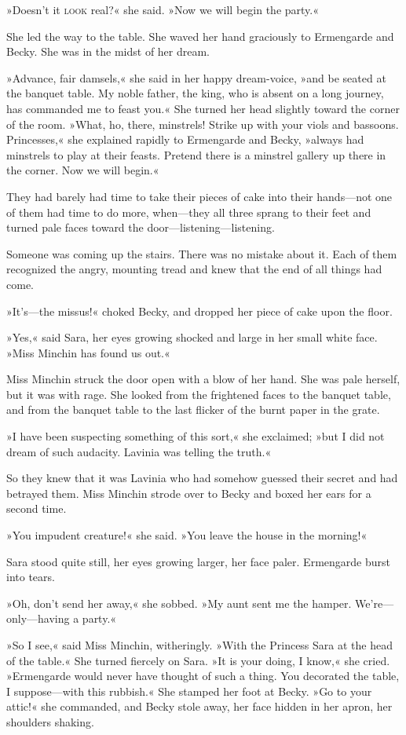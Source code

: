 »Doesn't it \textsc{look} real?« she said. »Now we will begin the party.«

She led the way to the table. She waved her hand graciously to Ermengarde and Becky. She was in the midst of her dream.

»Advance, fair damsels,« she said in her happy dream-voice, »and be seated at the banquet table. My noble father, the king, who is absent on a long journey, has commanded me to feast you.« She turned her head slightly toward the corner of the room. »What, ho, there, minstrels! Strike up with your viols and bassoons. Princesses,« she explained rapidly to Ermengarde and Becky, »always had minstrels to play at their feasts. Pretend there is a minstrel gallery up there in the corner. Now we will begin.«

They had barely had time to take their pieces of cake into their hands—not one of them had time to do more, when—they all three sprang to their feet and turned pale faces toward the door—listening—listening.

Someone was coming up the stairs. There was no mistake about it. Each of them recognized the angry, mounting tread and knew that the end of all things had come.

»It's—the missus!« choked Becky, and dropped her piece of cake upon the floor.

»Yes,« said Sara, her eyes growing shocked and large in her small white face. »Miss Minchin has found us out.«

Miss Minchin struck the door open with a blow of her hand. She was pale herself, but it was with rage. She looked from the frightened faces to the banquet table, and from the banquet table to the last flicker of the burnt paper in the grate.

»I have been suspecting something of this sort,« she exclaimed; »but I did not dream of such audacity. Lavinia was telling the truth.«

So they knew that it was Lavinia who had somehow guessed their secret and had betrayed them. Miss Minchin strode over to Becky and boxed her ears for a second time.

»You impudent creature!« she said. »You leave the house in the morning!«

Sara stood quite still, her eyes growing larger, her face paler. Ermengarde burst into tears.

»Oh, don't send her away,« she sobbed. »My aunt sent me the hamper. We're—only—having a party.«

»So I see,« said Miss Minchin, witheringly. »With the Princess Sara at the head of the table.« She turned fiercely on Sara. »It is your doing, I know,« she cried. »Ermengarde would never have thought of such a thing. You decorated the table, I suppose—with this rubbish.« She stamped her foot at Becky. »Go to your attic!« she commanded, and Becky stole away, her face hidden in her apron, her shoulders shaking.

